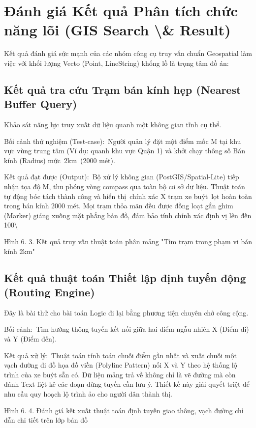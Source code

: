 \documentclass[13pt,a4paper]{report}
\begin{document}
\section{Đánh giá Kết quả Phân tích chức năng lõi (GIS Search \textbackslash{}& Result)}

Kết quả đánh giá sức mạnh của các nhóm công cụ truy vấn chuẩn Geospatial làm việc với khối lượng Vecto (Point, LineString) khổng lồ là trọng tâm đồ án:

\subsection{Kết quả tra cứu Trạm bán kính hẹp (Nearest Buffer Query)}

Khảo sát năng lực truy xuất dữ liệu quanh một không gian tĩnh cụ thể.

Bối cảnh thử nghiệm (Test-case): Người quản lý đặt một điểm mốc M tại khu vực vùng trung tâm (Ví dụ: quanh khu vực Quận 1) và khởi chạy thông số Bán kính (Radius) mức 2km (2000 mét).

Kết quả đạt được (Output): Bộ xử lý không gian (PostGIS/Spatial-Lite) tiếp nhận tọa độ M, thu phóng vòng compass qua toàn bộ cơ sở dữ liệu. Thuật toán tự động bóc tách thành công và hiển thị chính xác X trạm xe buýt lọt hoàn toàn trong bán kính 2000 mét. Mọi trạm thỏa mãn đều được đồng loạt gắn ghim (Marker) giáng xuống mặt phẳng bản đồ, đảm bảo tính chính xác định vị lên đến 100\textbackslash{}%

Hình 6. 3. Kết quả truy vấn thuật toán phân mảng "Tìm trạm trong phạm vi bán kính 2km"

\subsection{Kết quả thuật toán Thiết lập định tuyến động (Routing Engine)}

Đây là bài thử cho bài toán Logic đi lại bằng phương tiện chuyên chở công cộng.

Bối cảnh: Tìm hướng thông tuyến kết nối giữa hai điểm ngẫu nhiên X (Điểm đi) và Y (Điểm đến).

Kết quả xử lý: Thuật toán tính toán chuỗi điểm gần nhất và xuất chuỗi một vạch đường đi đồ họa đồ viền (Polyline Pattern) nối X và Y theo hệ thống lộ trình của xe buýt sẵn có. Dữ liệu mảng trả về không chỉ là vẽ đường mà còn đánh Text liệt kê các đoạn dừng tuyến cần lưu ý. Thiết kế này giải quyết triệt để nhu cầu quy hoạch lộ trình ảo cho người dân thành thị.

Hình 6. 4. Đánh giá kết xuất thuật toán định tuyến giao thông, vạch đường chỉ dẫn chi tiết trên lớp bản đồ
\end{document}
